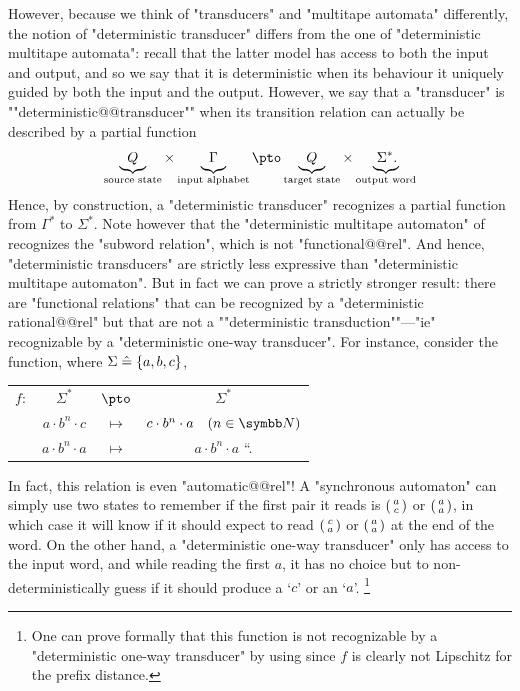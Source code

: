 However, because we think of "transducers" and "multitape automata" differently,
the notion of "deterministic transducer" differs from the one of
"deterministic multitape automata": recall that the latter model has access to both the input
and output, and so we say that it is deterministic when its behaviour it uniquely guided
by both the input and the output. However, we say that a "transducer" is
\AP""deterministic@@transducer"" when its transition relation can actually be described
by a partial function
\[
	\underbrace{\;\;Q\;\;}_{\text{source state\vphantom{l}}}
	\times \underbrace{\;\Gamma\vphantom{Q}\;}_{\text{input alphabet\vphantom{l}}}
	\pto
	\underbrace{\;\;Q\;\;}_{\text{target state\vphantom{l}}}
	\times \underbrace{\;{\Sigma^*}\vphantom{Q}.\!\;}_{\text{output word\vphantom{l}}}
\]
Hence, by construction, a "deterministic transducer" recognizes a partial function
from $\Gamma^*$ to $\Sigma^*$.
Note however that the "deterministic multitape automaton" of 
recognizes the "subword relation", which is not "functional@@rel".
And hence, "deterministic transducers" are strictly less expressive
than "deterministic multitape automaton".
But in fact we can prove a strictly stronger result:
there are "functional relations" that can be recognized by
a "deterministic rational@@rel" but that are not a
\AP""deterministic transduction""---"ie" recognizable by a "deterministic one-way transducer".
For instance, consider the function, where $\Sigma \mathrel{\hat{=}} \{a,b,c\}$,
\begin{center}
	\begin{tabular}{rccc}
		$f\colon$ & $\Sigma^*$ & $\pto$ & $\Sigma^*$ \\
		& $a\cdot b^n \cdot c$ & $\mapsto$ & $c \cdot b^n \cdot a \quad(n\in\N)$ \\
		& $a\cdot b^n \cdot a$ & $\mapsto$ & $a \cdot b^n \cdot a$ \qquad``\quad.
	\end{tabular}
\end{center}
In fact, this relation is even "automatic@@rel"! A "synchronous automaton"
can simply use two states to remember if the first pair it reads is
$\pair{a}{c}$ or $\pair{a}{a}$, in which case it will know if it should expect
to read $\pair{c}{a}$ or $\pair{a}{a}$ at the end of the word.
On the other hand, a "deterministic one-way transducer"
only has access to the input word, and while reading the first $a$, it has no choice
but to non-deterministically guess if it should produce a `$c$' or an `$a$'.%
\footnote{One can prove formally that this function is
not recognizable by a "deterministic one-way transducer"
by using \cite[Theorem~V.4.2]{Sakarovitch2009Elements}
since $f$ is clearly not Lipschitz for the prefix distance.}

